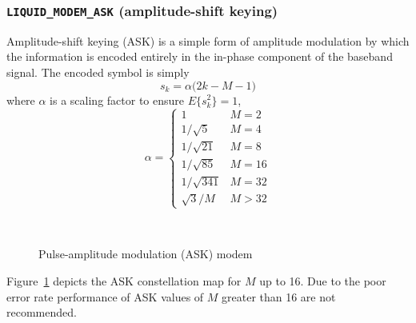 \subsubsection{{\tt LIQUID\_MODEM\_ASK} (amplitude-shift keying)}
\label{module:modem:digital:ASK}
Amplitude-shift keying (ASK) is a simple form of amplitude modulation by
which the information is encoded entirely in the in-phase component of
the baseband signal.
The encoded symbol is simply
%
\begin{equation}
    s_k = \alpha \bigl( 2 k - M - 1 \bigr)
\end{equation}
%
where $\alpha$ is a scaling factor to ensure $E\{s_k^2\}=1$,
%
\begin{equation}
    \alpha = 
    \begin{cases}
    1               &   M=2     \\
    1/\sqrt{5}      &   M=4     \\
    1/\sqrt{21}     &   M=8     \\
    1/\sqrt{85}     &   M=16    \\
    1/\sqrt{341}    &   M=32    \\
    \sqrt{3}/M      &   M > 32
    \end{cases}
\end{equation}
%
\begin{figure}
\centering
\mbox{
   \quad
   \quad
}
\mbox{
   \quad
   \quad
}
\caption{Pulse-amplitude modulation (ASK) modem}
\label{fig:modem:ask}
\end{figure}
%
Figure~\ref{fig:modem:ask} depicts the ASK constellation map for $M$ up
to 16.
Due to the poor error rate performance of ASK values of $M$ greater than
16 are not recommended.


